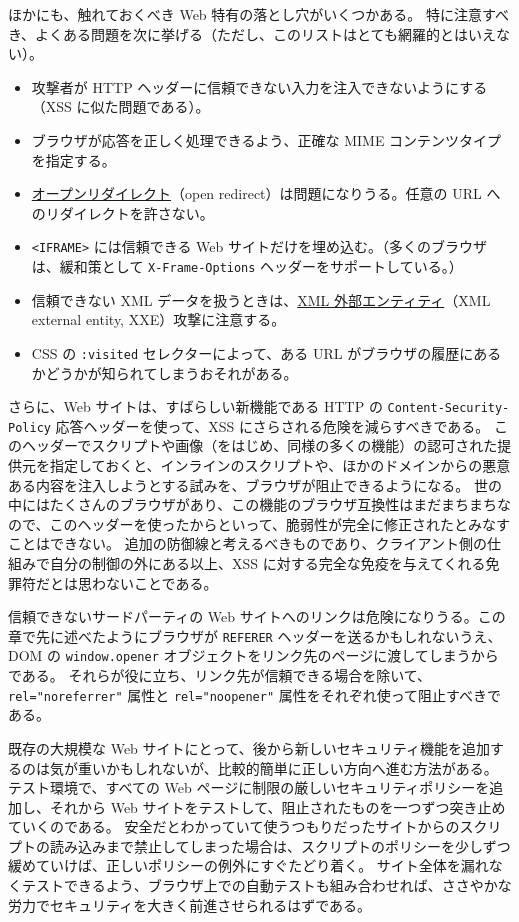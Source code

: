\documentclass[uplatex]{jsarticle}
\begin{document}
ほかにも、触れておくべき Web 特有の落とし穴がいくつかある。
特に注意すべき、よくある問題を次に挙げる（ただし、このリストはとても網羅的とはいえない）。
\begin{itemize}
\item 攻撃者が HTTP ヘッダーに信頼できない入力を注入できないようにする（XSS に似た問題である）。
\item ブラウザが応答を正しく処理できるよう、正確な MIME コンテンツタイプを指定する。
\item \underline{オープンリダイレクト}（open redirect）は問題になりうる。任意の URL へのリダイレクトを許さない。
\item \texttt{<IFRAME>} には信頼できる Web サイトだけを埋め込む。（多くのブラウザは、緩和策として \texttt{X-Frame-Options} ヘッダーをサポートしている。）
\item 信頼できない XML データを扱うときは、\underline{XML 外部エンティティ}（XML external entity, XXE）攻撃に注意する。
\item CSS の \texttt{:visited} セレクターによって、ある URL がブラウザの履歴にあるかどうかが知られてしまうおそれがある。
\end{itemize}

さらに、Web サイトは、すばらしい新機能である HTTP の \texttt{Content-Security-Policy} 応答ヘッダーを使って、XSS にさらされる危険を減らすべきである。
このヘッダーでスクリプトや画像（をはじめ、同様の多くの機能）の認可された提供元を指定しておくと、インラインのスクリプトや、ほかのドメインからの悪意ある内容を注入しようとする試みを、ブラウザが阻止できるようになる。
世の中にはたくさんのブラウザがあり、この機能のブラウザ互換性はまだまちまちなので、このヘッダーを使ったからといって、脆弱性が完全に修正されたとみなすことはできない。
追加の防御線と考えるべきものであり、クライアント側の仕組みで自分の制御の外にある以上、XSS に対する完全な免疫を与えてくれる免罪符だとは思わないことである。

信頼できないサードパーティの Web サイトへのリンクは危険になりうる。この章で先に述べたようにブラウザが \texttt{REFERER} ヘッダーを送るかもしれないうえ、DOM の \texttt{window.opener} オブジェクトをリンク先のページに渡してしまうからである。
それらが役に立ち、リンク先が信頼できる場合を除いて、\texttt{rel="noreferrer"} 属性と \texttt{rel="noopener"} 属性をそれぞれ使って阻止すべきである。

既存の大規模な Web サイトにとって、後から新しいセキュリティ機能を追加するのは気が重いかもしれないが、比較的簡単に正しい方向へ進む方法がある。
テスト環境で、すべての Web ページに制限の厳しいセキュリティポリシーを追加し、それから Web サイトをテストして、阻止されたものを一つずつ突き止めていくのである。
安全だとわかっていて使うつもりだったサイトからのスクリプトの読み込みまで禁止してしまった場合は、スクリプトのポリシーを少しずつ緩めていけば、正しいポリシーの例外にすぐたどり着く。
サイト全体を漏れなくテストできるよう、ブラウザ上での自動テストも組み合わせれば、ささやかな労力でセキュリティを大きく前進させられるはずである。
\end{document}
